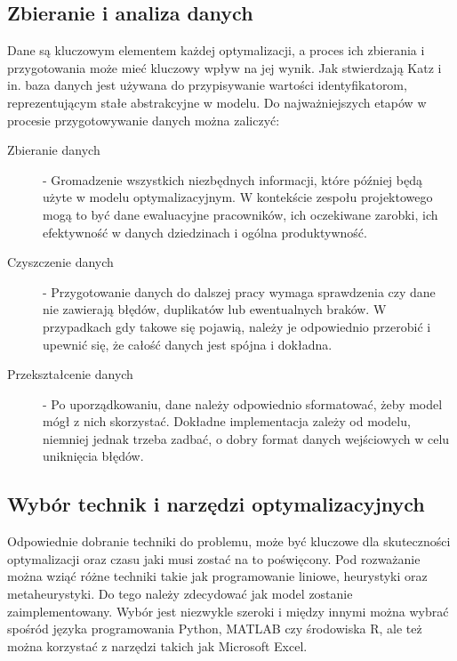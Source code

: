     \subsection{Zbieranie i analiza danych}
    \par Dane są kluczowym elementem każdej optymalizacji, a proces ich zbierania i przygotowania może mieć kluczowy wpływ na jej wynik. Jak stwierdzają Katz i in. \parencite{katz1980system} baza danych jest używana do przypisywanie wartości identyfikatorom, reprezentującym stałe abstrakcyjne w modelu. Do najważniejszych etapów w procesie przygotowywanie danych można zaliczyć:
    \begin{description}
        \item[Zbieranie danych] - Gromadzenie wszystkich niezbędnych informacji, które później będą użyte w modelu optymalizacyjnym. W kontekście zespołu projektowego mogą to być dane ewaluacyjne pracowników, ich oczekiwane zarobki, ich efektywność w danych dziedzinach i ogólna produktywność.
        \item[Czyszczenie danych] - Przygotowanie danych do dalszej pracy wymaga sprawdzenia czy dane nie zawierają błędów, duplikatów lub ewentualnych braków. W przypadkach gdy takowe się pojawią, należy je odpowiednio przerobić i upewnić się, że całość danych jest spójna i dokładna.
        \item[Przekształcenie danych] - Po uporządkowaniu, dane należy odpowiednio sformatować, żeby model mógł z nich skorzystać. Dokładne implementacja zależy od modelu, niemniej jednak trzeba zadbać, o dobry format danych wejściowych w celu uniknięcia błędów.
    \end{description}

    \subsection{Wybór technik i narzędzi optymalizacyjnych}
    \par Odpowiednie dobranie techniki do problemu, może być kluczowe dla skuteczności optymalizacji oraz czasu jaki musi zostać na to poświęcony. Pod rozważanie można wziąć różne techniki takie jak programowanie liniowe, heurystyki oraz metaheurystyki. Do tego należy zdecydować jak model zostanie zaimplementowany. Wybór jest niezwykle szeroki i między innymi można wybrać spośród języka programowania Python, MATLAB czy środowiska R, ale też można korzystać z narzędzi takich jak Microsoft Excel.

